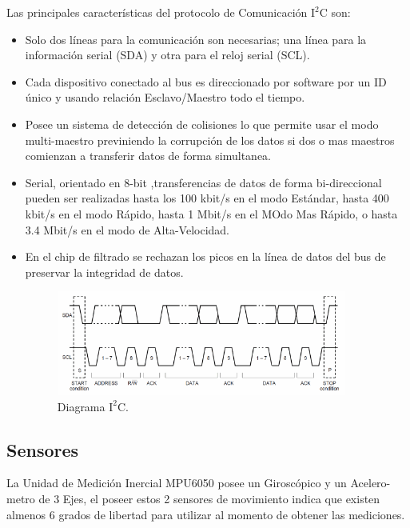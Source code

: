\documentclass[12pt,a4paper]{article}
\begin{document}
Las principales características del protocolo de Comunicación $\mathrm{I^2C}$ \cite{I2C} son:
\begin{itemize}
\item Solo dos líneas para la comunicación son necesarias; una línea para la información serial (SDA) y otra para el reloj serial (SCL).
\item Cada dispositivo conectado al bus es direccionado por software por un ID único y usando relación Esclavo/Maestro todo el tiempo.
\item Posee un sistema de detección de colisiones lo que permite usar el modo multi-maestro previniendo la corrupción de los datos si dos o mas maestros comienzan a transferir datos de forma simultanea.
\item Serial, orientado en 8-bit ,transferencias de datos de forma bi-direccional pueden ser realizadas hasta los 100 kbit/s en el modo Estándar, hasta 400 kbit/s en el modo Rápido, hasta 1 Mbit/s en el MOdo Mas Rápido, o hasta 3.4 Mbit/s en el modo de Alta-Velocidad.
\item En el chip de filtrado se rechazan los picos en la línea de datos del bus de preservar la integridad de datos.


\begin{figure}[H]
	\centering
  	\includegraphics[width=0.9\textwidth]{images/Diagrama_I2C}
    \caption{Diagrama $\mathrm{I^2C.}$}
	\label{fig:diagramaI2C}
\end{figure}
\end{itemize}
\subsection{Sensores}

La Unidad de Medición Inercial MPU6050\cite{MPU6050} posee un Giroscópico y un Acelero-metro de 3 Ejes, el poseer estos 2 sensores de movimiento indica que existen almenos 6 grados de libertad para utilizar al momento de obtener las mediciones.
\end{document}
